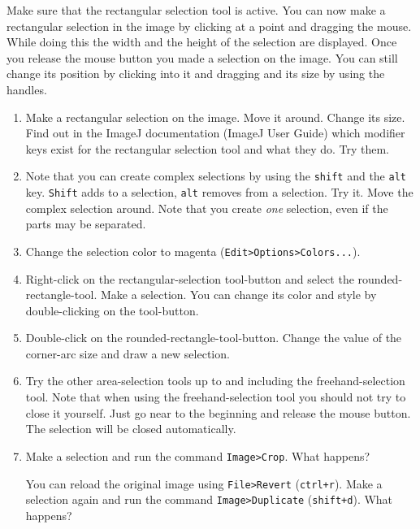 Make sure that the rectangular selection tool is active. You can now make a rectangular selection in the image by clicking at a point and dragging the mouse. While doing this the width and the height of the selection are displayed. Once you release the mouse button you made a selection on the image. You can still change its position by clicking into it and dragging and its size by using the handles.

\begin{enumerate}
\item Make a rectangular selection on the image. Move it around. Change its size. Find out in the ImageJ documentation (ImageJ User Guide) which modifier keys exist for the rectangular selection tool and what they do. Try them.

\fbox{
	\begin{minipage}{\linewidth}
		\hfill\vspace{2cm}
	\end{minipage}
	}
	
\item Note that you can create complex selections by using the \texttt{shift} and the \texttt{alt} key. \texttt{Shift} adds to a selection, \texttt{alt} removes from a selection. Try it. Move the complex selection around. Note that you create \textit{one} selection, even if the parts may be separated.
\item Change the selection color to magenta (\texttt{Edit>Options>Colors...}).
\item Right-click on the rectangular-selection tool-button and select the rounded-rectangle-tool. Make a selection. You can change its color and style by double-clicking on the tool-button.
\item Double-click on the rounded-rectangle-tool-button. Change the value of the corner-arc size and draw a new selection.
\item Try the other area-selection tools up to and including the freehand-selection tool. Note that when using the freehand-selection tool you should not try to close it yourself. Just go near to the beginning and release the mouse button. The selection will be closed automatically.
\item Make a selection and run the command \texttt{Image>Crop}. What happens?

\fbox{
	\begin{minipage}{\linewidth}
		\hfill\vspace{2cm}
	\end{minipage}
	}
	
You can reload the original image using \texttt{File>Revert} (\texttt{ctrl+r}). Make a selection again and
run the command \texttt{Image>Duplicate} (\texttt{shift+d}). What happens?

\fbox{
	\begin{minipage}{\linewidth}
		\hfill\vspace{2cm}
	\end{minipage}
	}
\end{enumerate}

